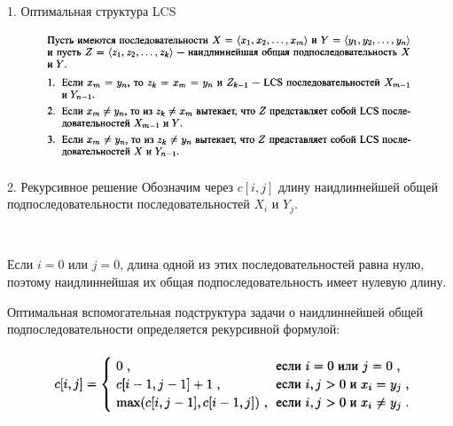 \documentclass{beamer}
\begin{document}
\begin{frame}{1. Оптимальная структура LCS}
    \begin{figure}[h]
		\centering
		\includegraphics[scale=0.5]{images/lec09-pic19.png}
	\end{figure} 
\end{frame}

\begin{frame}{2. Рекурсивное решение}
    Обозначим через $c[i,j]$ длину наидлиннейшей общей подпоследовательности последовательностей $X_i$ и $Y_j$. 
    
    ~
    
    Если $i=0$ или $j=0$, длина одной из этих последовательностей равна нулю, поэтому наидлиннейшая их общая подпоследовательность имеет нулевую длину. 
    
    Оптимальная вспомогательная подструктура задачи о наидлиннейшей общей подпоследовательности определяется рекурсивной формулой:
    \begin{figure}[h]
		\centering
		\includegraphics[scale=0.6]{images/lec09-pic20.png}
	\end{figure} 
\end{frame}
\end{document}
